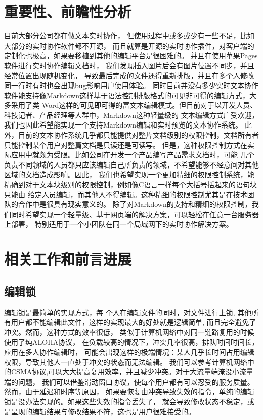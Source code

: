 \documentclass[11pt]{ctexart}
\begin{document}
\section{重要性、前瞻性分析}
目前大部分公司都在做文本实时协作，
但使用过程中或多或少有一些不足，比如大部分的实时协作软件都不开源，
而且就算是开源的实时协作插件，对客户端的定制化也极高，如果要移植到其他的编辑平台是很困难的。
并且在使用苹果Pages软件进行实时协作编辑文档时，
我们发现插入图片后会有图片位置不同步，并且经常位置出现随机变化，
导致最后完成的文件还得重新排版，并且在多个人修改同一行时有时也会出现bug影响用户使用体验。
同时目前并没有多少实时文本协作软件能支持像Markdown这样基于语法控制排版格式的可见非可得的编辑方式，大多采用了类
Word这样的可见即可得的富文本编辑模式。但目前对于以开发人员、科技记者、产品经理等人群中，Markdown这种轻量级的
文本编辑方式广受欢迎，我们也因此希望能实现一个支持Markdown编辑和实时预览的文本协作系统。
此外，目前的文本协作系统几乎都只能提供对整片文档级别的权限控制，文档所有者只能控制某个用户对整篇文档是只读还是可读写。
但是，这种权限控制方式在实际应用中就颇为受限。比如公司在开发一个产品编写产品需求文档时，可能
几个负责不同领域的人员都只应该编辑自己所负责的领域，不希望能够不经意间对其他区域的文档造成影响。因此，
我们也希望实现一个更加精细的权限控制系统，能精确到对于文本块级别的权限控制，例如像C语言一样每个大括号括起来的语句块只能由
给定人员编辑，而其他人不得编辑。这种精细的权限控制尤其是在技术团队的合作中是很具有现实意义的。
除了对Markdown的支持和精细的权限控制，我们同时希望实现一个轻量级、基于网页端的解决方案，可以轻松在任意一台服务器上部署，
特别适用于一个小团队在同一个局域网下的实时协作解决方案。

\section{相关工作和前言进展}


\subsection{编辑锁}
编辑锁是最简单的实现方式，每
个人在编辑文件的同时，对文件进行上锁,
其他所有用户都不能编辑此文件，这样的实现最大的好处就是逻辑简单,
而且完全避免了冲突。然而，这种方式的效率很低，
类似于计算机网络中对同一链路复用的时候使用了纯ALOHA协议，
在负载较高的情况下，冲突几率很高，排队时间时间长，应用在多人协作编辑时，
可能会出现这样的极端情况：某人几乎长时间占用编辑权限，导致其他人一直处于冲突的状态而无法编辑。
我们可以参考计算机网络中的CSMA协议,可以大大提高复用效率，并且减少冲突。对于大流量端淹没小流量端的问题，
我们可以借鉴滑动窗口协议，使每个用户都有可以忍受的服务质量。然而，由于延迟和时序等原因，
如果要恢复由冲突导致失效的指令，单纯的编辑锁是没办法实现的。如果这些失效的指令丢失了，
就会导致修改状态不稳定，或是呈现的编辑结果与修改结果不符，这也是用户很难接受的。
\end{document}
